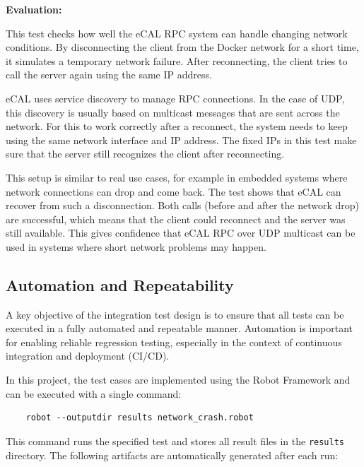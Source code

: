 \vspace{0.5em}
\textbf{Evaluation:}

\vspace{0.4em}
This test checks how well the eCAL RPC system can handle changing network conditions. By disconnecting the client from the Docker network for a short time, it simulates a temporary network failure. After reconnecting, the client tries to call the server again using the same IP address.

\vspace{1em}
eCAL uses service discovery to manage RPC connections. In the case of UDP, this discovery is usually based on multicast messages that are sent across the network. For this to work correctly after a reconnect, the system needs to keep using the same network interface and IP address. The fixed IPs in this test make sure that the server still recognizes the client after reconnecting.

\vspace{1em}
This setup is similar to real use cases, for example in embedded systems where network connections can drop and come back. The test shows that eCAL can recover from such a disconnection. Both calls (before and after the network drop) are successful, which means that the client could reconnect and the server was still available. This gives confidence that eCAL RPC over UDP multicast can be used in systems where short network problems may happen.


\subsection{Automation and Repeatability}

A key objective of the integration test design is to ensure that all tests can be executed in a fully automated and repeatable manner. Automation is important for enabling reliable regression testing, especially in the context of continuous integration and deployment (CI/CD).

\vspace{0.9em}
In this project, the test cases are implemented using the Robot Framework and can be executed with a single command:

\begin{verbatim}
	robot --outputdir results network_crash.robot
\end{verbatim}

\vspace{0.5em}
This command runs the specified test and stores all result files in the \texttt{results} directory. The following artifacts are automatically generated after each run:

